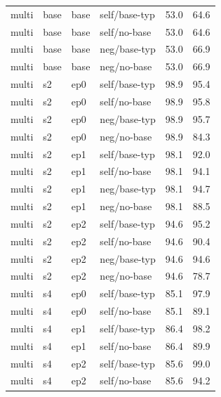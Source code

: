 {\begin{longtable}{llll rr}
\midrule
multi & base & base & self/base-typ & 53.0 & 64.6 \\
multi & base & base & self/no-base & 53.0 & 64.6 \\
multi & base & base & neg/base-typ & 53.0 & 66.9 \\
multi & base & base & neg/no-base & 53.0 & 66.9 \\
multi & s2 & ep0 & self/base-typ & 98.9 & 95.4 \\
multi & s2 & ep0 & self/no-base & 98.9 & 95.8 \\
multi & s2 & ep0 & neg/base-typ & 98.9 & 95.7 \\
multi & s2 & ep0 & neg/no-base & 98.9 & 84.3 \\
multi & s2 & ep1 & self/base-typ & 98.1 & 92.0 \\
multi & s2 & ep1 & self/no-base & 98.1 & 94.1 \\
multi & s2 & ep1 & neg/base-typ & 98.1 & 94.7 \\
multi & s2 & ep1 & neg/no-base & 98.1 & 88.5 \\
multi & s2 & ep2 & self/base-typ & 94.6 & 95.2 \\
multi & s2 & ep2 & self/no-base & 94.6 & 90.4 \\
multi & s2 & ep2 & neg/base-typ & 94.6 & 94.6 \\
multi & s2 & ep2 & neg/no-base & 94.6 & 78.7 \\
multi & s4 & ep0 & self/base-typ & 85.1 & 97.9 \\
multi & s4 & ep0 & self/no-base & 85.1 & 89.1 \\
multi & s4 & ep1 & self/base-typ & 86.4 & 98.2 \\
multi & s4 & ep1 & self/no-base & 86.4 & 89.9 \\
multi & s4 & ep2 & self/base-typ & 85.6 & 99.0 \\
multi & s4 & ep2 & self/no-base & 85.6 & 94.2 \\
\bottomrule
\end{longtable}
}
